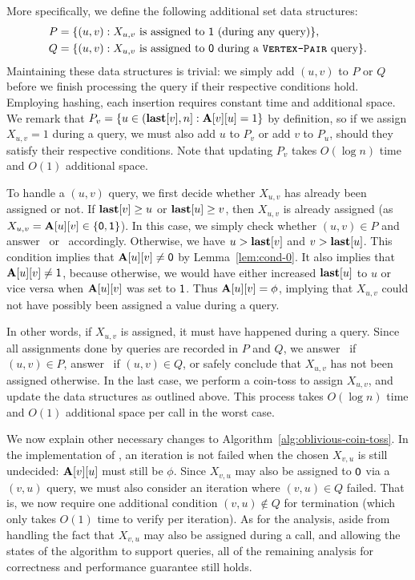 More specifically, we define the following additional set data structures:
\begin{align*}
P &= \{(u,v): X_{u,v}\textrm{ is assigned to }\mathsf{1} \textrm{ (during any query)}\},\\
Q &= \{(u,v): X_{u,v}\textrm{ is assigned to }\mathsf{0} \textrm{ during a \texttt{\textsc{Vertex-Pair}} query}\}.
\end{align*}
Maintaining these data structures is trivial: we simply add $(u,v)$ to $P$ or $Q$ before we finish processing the query if their respective conditions hold. Employing hashing, each insertion requires constant time and additional space. We remark that $P_v = \{u \in (\mathbf{last}[v], n]: \mathbf{A}[v][u]=1\}$ by definition, so if we assign $X_{u,v} = 1$ during a  query, we must also add $u$ to $P_v$ or add $v$ to $P_u$, should they satisfy their respective conditions. Note that updating $P_v$ takes $O(\log n)$ time and $O(1)$ additional space.

To handle a $(u,v)$ query, we first decide whether $X_{u,v}$ has already been assigned or not. If $\mathbf{last}[v] \geq u$ or $\mathbf{last}[u] \geq v$, then $X_{u,v}$ is already assigned (as $X_{u,v}=\mathbf{A}[u][v] \in \{\mathsf{0},\mathsf{1}\}$). In this case, we simply check whether $(u,v)\in P$ and answer \YES~or \NO~accordingly. Otherwise, we have $u > \mathbf{last}[v]$ and $v > \mathbf{last}[u]$. This condition implies that $\mathbf{A}[u][v] \neq \mathsf{0}$ by Lemma~\ref{lem:cond-0}. It also implies that $\mathbf{A}[u][v] \neq \mathsf{1}$, because otherwise, we would have either increased $\mathbf{last}[u]$ to $u$ or vice versa when $\mathbf{A}[u][v]$ was set to $\mathsf{1}$. Thus $\mathbf{A}[u][v] = \phi$, implying that $X_{u,v}$ could not have possibly been assigned a value during a  query.

In other words, if $X_{u,v}$ is assigned, it must have happened during a  query. Since all assignments done by  queries are recorded in $P$ and $Q$, we answer \YES~if $(u,v)\in P$, answer \NO~if $(u,v)\in Q$, or safely conclude that $X_{u,v}$ has not been assigned otherwise. In the last case, we perform a coin-toss to assign $X_{u,v}$, and update the data structures as outlined above. This process takes $O(\log n)$ time and $O(1)$ additional space per  call in the worst case.

We now explain other necessary changes to Algorithm~\ref{alg:oblivious-coin-toss}. In the implementation of , an iteration is not failed when the chosen $X_{v,u}$ is still undecided: $\mathbf{A}[v][u]$ must still be $\phi$. Since $X_{v,u}$ may also be assigned to $\mathsf{0}$ via a $(v,u)$ query, we must also consider an iteration where $(v,u) \in Q$ failed. That is, we now require one additional condition $(v,u) \notin Q$ for termination (which only takes $O(1)$ time to verify per iteration). As for the analysis, aside from handling the fact that $X_{v,u}$ may also be assigned during a  call, and allowing the states of the algorithm to support  queries, all of the remaining analysis for correctness and performance guarantee still holds. 


